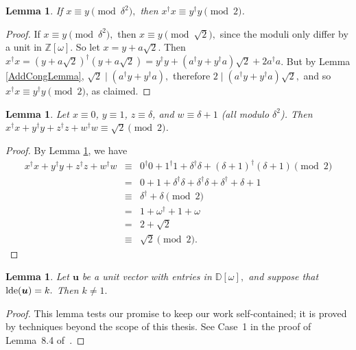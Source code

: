 \documentclass{dalthesis}
\theoremstyle{theorem}
\newtheorem{lemma}[theorem]{Lemma}
\theoremstyle{definition}
\theoremstyle{definition}  %
\theoremstyle{definition}
\newcommand{\Z}{\mathbb{Z}}
\newcommand{\D}{\mathbb{D}}
\renewcommand{\:}{\mathbin{:}}
\newcommand{\lde}{\mathop{\rm lde}\nolimits}
\newcommand{\divides}{\mid}
\begin{document}
\begin{lemma}
\label{ModDeltaSqLemma}
If $x\equiv y \pmod{\delta^2},$ then $x^\dagger x\equiv y^\dagger y \pmod{2}$.
\end{lemma}

\begin{proof}
 If $x\equiv y\pmod{\delta^2},$ then $x\equiv y\pmod{\sqrt{2}},$ since the moduli only differ by a unit in $\Z[\omega].$ So let $x = y + a\sqrt{2}$. Then $x^\dag x = (y + a\sqrt{2})^\dag(y + a\sqrt{2}) = y^\dag y + (a^\dag y + y^\dag a)\sqrt{2} + 2a^\dag a$. But by Lemma \ref{AddCongLemma}, $\sqrt{2}\divides(a^\dag y + y^\dag a),$ therefore
$2 \divides (a^\dag y + y^\dag a)\sqrt{2},$ and so $ x^\dag x\equiv y^\dag y \pmod{2}$, as claimed.
\end{proof}

\begin{lemma}
\label{RootTwoModTwoLemma}
Let $x\equiv 0$, $y\equiv 1$, $z\equiv \delta$, and $w\equiv \delta+1$ (all modulo $\delta^2$). Then $x^\dagger x + y^\dagger y + z^\dagger z +
w^\dagger w \equiv \sqrt{2}\pmod{2}$. 
\end{lemma}

\begin{proof}
By Lemma \ref{ModDeltaSqLemma}, we have \[\begin{array}{ccc}
x^\dagger x + y^\dagger y + z^\dagger z + w^\dagger w
&\equiv& 0^\dag 0 + 1^\dag 1 + \delta^\dag\delta + (\delta+1)^\dag(\delta+1)\pmod{2}\\
&=& 0 + 1 + \delta^\dag \delta + \delta^\dag\delta + \delta^\dag + \delta + 1\\
&\equiv& \delta^\dag + \delta\pmod{2}\\
&=& 1 + \omega^\dag + 1 + \omega\\
& =& 2 + \sqrt{2}\\
&\equiv& \sqrt{2}\pmod{2}.
\end{array}
\]
\end{proof}

\begin{lemma}
\label{HandWaveLemma}
Let $\boldsymbol{u}$ be a unit vector with entries in $\D[\omega],$ and suppose that $\lde(\boldsymbol{u}) = k.$ Then $k\neq 1.$
\end{lemma}
\begin{proof}
This lemma tests our promise to keep our work self-contained; it is proved by techniques beyond the scope of this thesis. See Case~1 in the proof of Lemma~8.4 of~\cite{ROSS-SEL}.
\end{proof}
\end{document}
